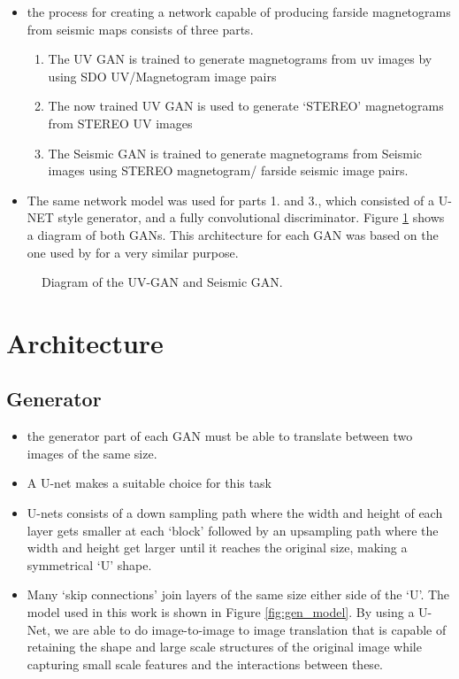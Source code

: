 \documentclass[11pt,a4paper,onecolumn]{report}
\begin{document}
\begin{itemize}
  \item the process for creating a network capable of producing farside
  magnetograms from seismic maps consists of three parts.
  \begin{enumerate}
    \item The UV GAN is trained to generate magnetograms from uv images by using
    SDO UV/Magnetogram image pairs
    \item The now trained UV GAN is used to generate `STEREO' magnetograms from
    STEREO UV images
    \item The Seismic GAN is trained to generate magnetograms from Seismic
    images using STEREO magnetogram/ farside seismic image pairs.
  \end{enumerate}
  
  \item The same network model was used for parts 1. and 3., which consisted of
  a U-NET style generator, and a fully convolutional discriminator. Figure
  \ref{fig:solar_gans_diagram} shows a diagram of both GANs. This architecture
  for each GAN was based on the one used by \citet{Kim2019} for a very similar
  purpose.
\end{itemize}

\begin{figure}
  \centering
  \caption{Diagram of the UV-GAN and Seismic GAN.}
  \label{fig:solar_gans_diagram}
\end{figure}

%
%
%
%
%
\section{Architecture}
%
%
%
%
%
%

\subsection{Generator}





\begin{itemize}
  \item the generator part of each GAN must be able to translate between two
  images of the same size.
  \item A U-net \citep{ronneberger_u-net_2015} makes a suitable choice for this task
  \item U-nets consists of a down sampling path where the width and height of
  each layer gets
  smaller at each `block' followed by an upsampling path where the width and height
  get larger until it reaches the original size, making a symmetrical `U' shape.
  \item   Many `skip connections' join layers of the same size either side of
  the `U'. The model used in this work is shown in Figure \ref{fig:gen_model}.
  By using a U-Net, we are able to do image-to-image to image translation that
  is capable of retaining the shape and large scale structures of the original
  image while capturing small scale features and the interactions between these.
\end{itemize}
  
\end{document}
